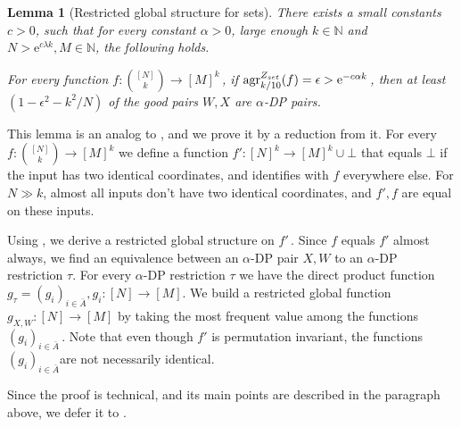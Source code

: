 \documentclass[11pt]{article}
\numberwithin{equation}{section}
\newtheorem{lemma}[theorem]{Lemma}
\theoremstyle{definition}
\theoremstyle{plain}
\newcommand{\eee}{\mathrm e}
\newcommand\f{f} %
\newcommand\setf{f} %
\newcommand{\g}{g} %
\newcommand{\test}[2]{
	\ifx &#2&
	\textrm{agr}^{#1}
	\else	
	\textrm{agr}^{#1}_{#2}
	\fi}
\newcommand{\sets}{\binom{[N]}{k}} %
\newcommand\rest[1]{{\bar{#1}}}  %
\begin{document}
\begin{lemma}[Restricted global structure for sets]\label{lem:local structure for sets}
	There exists a small constants $c>0$, such that for every constant $\alpha>0$, large enough $k\in\mathbb{N}$ and $N > \eee^{c\lambda k},M\in\mathbb{N}$, the following holds.
	
	For every function  $\setf:\sets\rightarrow[M]^k$\,, if $\test{Z_{set}}{k/10}(\setf)=\epsilon > \eee^{-c\alpha k}$\,, then  at least $(1-\epsilon^2-
	k^2/N%
	)$ of the good pairs $W,X$ are $\alpha$-DP pairs.
\end{lemma}
This lemma is an analog to , and we prove it by a reduction from it. For every $\f:\sets\rightarrow[M]^k$ we define a function $\f':[N]^k\rightarrow[M]^k\cup \bot$ that equals $\bot$ if the input has two identical coordinates, and identifies with $\setf$ everywhere else. For $N\gg k$, almost all inputs don't have two identical coordinates, and $\f',\setf$ are equal on these inputs.

Using , we derive a restricted global structure on $\f'$\,. Since $\setf$ equals $\f'$ almost always, we find an equivalence between an $\alpha$-DP pair $X,W$ to an $\alpha$-DP restriction $\tau$. For every $\alpha$-DP restriction $\tau$ we have the direct product function $\g_\tau=(\g_i)_{i\in\rest{A}}, \g_i:[N]\rightarrow[M]$. We build a restricted global function $\g_{X,W}:[N]\rightarrow[M]$ by taking the most frequent value among the functions $(\g_i)_{i\in\rest{A}}$\,. Note that even though $\f'$ is permutation invariant, the functions $(\g_i)_{i\in\rest{A}}$are not necessarily identical.

Since the proof is technical, and its main points are described in the paragraph above, we defer it to .
\end{document}
